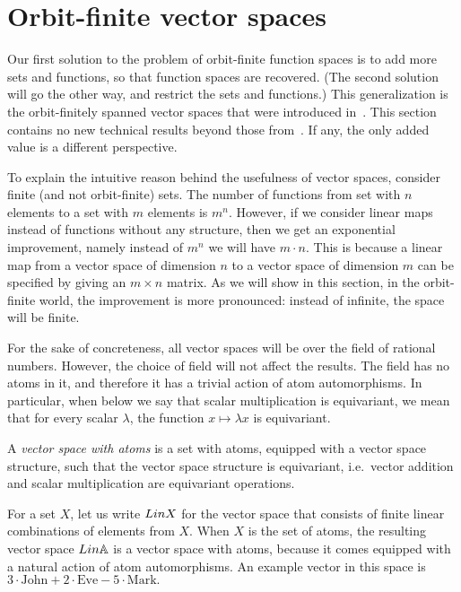 \section{Orbit-finite vector spaces}
Our first solution to the problem of orbit-finite function spaces is to add more sets and functions, so that function spaces are recovered. (The second solution will go the other way, and restrict the sets and functions.) 
This generalization is the orbit-finitely spanned vector spaces that were introduced in~\cite{bojanczykKM21OrbitFiniteVector}. This section contains no new technical results beyond those from~\cite{bojanczykKM21OrbitFiniteVector}. If any, the only added value is a different perspective.

To explain the intuitive reason behind the usefulness of vector spaces, consider finite (and not orbit-finite) sets. The number of functions from set with $n$ elements to a set with $m$ elements is $m^n$. However, if we consider linear maps instead of functions without any structure, then we get an exponential improvement, namely instead of $m^n$ we will have $m \cdot n$. 
This is because a linear map from a vector space of dimension $n$ to a vector space of dimension $m$ can be specified by giving an $m \times n$ matrix. As we will show in this section,  in the orbit-finite world, the improvement is more pronounced: instead of infinite, the space will be finite.

For the sake of concreteness, all  vector spaces will be over the field of rational numbers. However, the choice of field will not affect the results. The field has no atoms in it, and therefore it has a trivial action of atom automorphisms. In particular, when below we say that scalar multiplication is equivariant, we mean that for every scalar $\lambda$, the function $x \mapsto \lambda x$ is equivariant.
\begin{definition}
    A \emph{vector space with atoms} is a set with atoms, equipped with a vector space structure, such that the vector space structure is equivariant, i.e.~vector addition and scalar multiplication are equivariant operations.
\end{definition}


\begin{example} \label{ex:lina} For a set $X$, let us write $\Lin X$ for the vector space that consists of finite linear combinations of elements from $X$. When $X$ is the set of atoms, the resulting vector space $\Lin \atoms$ is a vector space with atoms, because it comes equipped with a natural action of atom automorphisms.  An example vector in this space is $
3 \cdot \text{John} + 2 \cdot \text{Eve} - 5 \cdot \text{Mark}.
$
\end{example}

